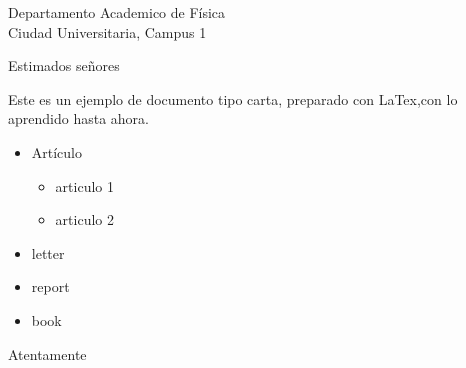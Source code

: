 \documentclass[12pt,a4paper]{letter} %
\begin{document}
     \pagecolor{blue!25} %
     
     \begin{letter}{Departamento Academico de Física\\
         Ciudad Universitaria, Campus 1}
         \opening{Estimados se\~nores}
         Este es un ejemplo de documento tipo carta,
         preparado con LaTex,con lo aprendido hasta ahora.
      
         \begin{itemize}
             \item Art\'{i}culo
             \begin{itemize}
                 \item articulo 1
                 \item articulo 2
             \end{itemize}
             \item letter
             \item report
             \item book
         \end{itemize}
     \closing{Atentamente}
     \end{letter}
\end{document}
